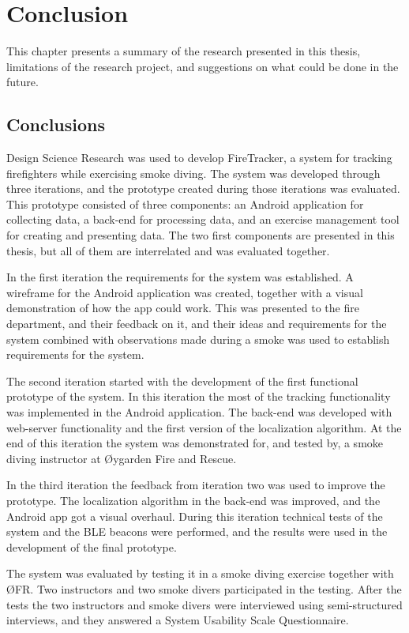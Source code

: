 \documentclass[../Main/thesis.tex]{subfiles}
\begin{document}
\chapter{Conclusion}
\label{ch:conclusion}
This chapter presents a summary of the research presented in this thesis, limitations of the research project, and suggestions on what could be done in the future.

\section{Conclusions}
Design Science Research was used to develop FireTracker, a system for tracking firefighters while exercising smoke diving.
The system was developed through three iterations, and the prototype created during those iterations was evaluated.
This prototype consisted of three components: an Android application for collecting data, a back-end for processing data, and an exercise management tool for creating and presenting data.
The two first components are presented in this thesis, but all of them are interrelated and was evaluated together.

In the first iteration the requirements for the system was established. 
A wireframe for the Android application was created, together with a visual demonstration of how the app could work.
This was presented to the fire department, and their feedback on it, and their ideas and requirements for the system combined with observations made during a smoke was used to establish requirements for the system.

The second iteration started with the development of the first functional prototype of the system.
In this iteration the most of the tracking functionality was implemented in the Android application.
The back-end was developed with web-server functionality and the first version of the localization algorithm.
At the end of this iteration the system was demonstrated for, and tested by, a smoke diving instructor at Øygarden Fire and Rescue.


In the third iteration the feedback from iteration two was used to improve the prototype.
The localization algorithm in the back-end was improved, and the Android app got a visual overhaul.
During this iteration technical tests of the system and the BLE beacons were performed, and the results were used in the development of the final prototype.

The system was evaluated by testing it in a smoke diving exercise together with ØFR.
Two instructors and two smoke divers participated in the testing.
After the tests the two instructors and smoke divers were interviewed using semi-structured interviews, and they answered a System Usability Scale Questionnaire.
\end{document}
